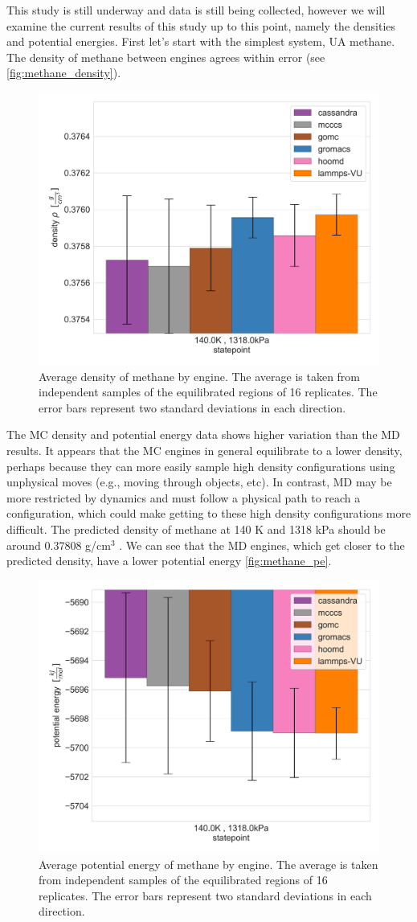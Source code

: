 This study is still underway and data is still being collected, however we will examine the current results of this study up to this point, namely the densities and potential energies.
First let's start with the simplest system, UA methane.
The density of methane between engines agrees within error (see \autoref{fig:methane_density}).
\begin{figure}[h!]
    \centering
    \includegraphics[width=0.6\linewidth,keepaspectratio]{figures/rep_study/methaneUA_summary.png}
    \caption{Average density of methane by engine. The average is taken from independent samples of the equilibrated regions of 16 replicates. The error bars represent two standard deviations in each direction.}\label{fig:methane_density}
\end{figure}
The MC density and potential energy data shows higher variation than the MD results. %
It appears that the MC engines in general equilibrate to a lower density, perhaps because they can more easily sample high density configurations using unphysical moves (e.g., moving through objects, etc).
In contrast, MD may be more restricted by dynamics and must follow a physical path to reach a configuration, which could make getting to these high density configurations more difficult.
The predicted density of methane at 140 K and 1318 kPa should be around 0.37808 g/cm$^3$ \cite{NISTwebbook}.
We can see that the MD engines, which get closer to the predicted density, have a lower potential energy \autoref{fig:methane_pe}.
\begin{figure}[h!]
    \centering
    \includegraphics[width=0.6\linewidth,keepaspectratio]{figures/rep_study/methaneUA_pe_summary.png}
    \caption{Average potential energy of methane by engine. The average is taken from independent samples of the equilibrated regions of 16 replicates. The error bars represent two standard deviations in each direction.}\label{fig:methane_pe}
\end{figure}

